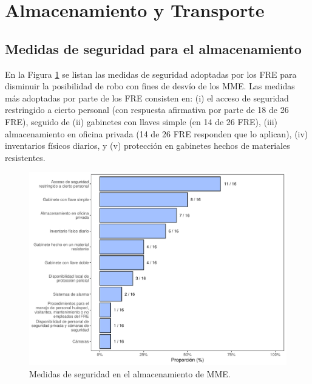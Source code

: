 \documentclass[
]{book}
\begin{document}
\hypertarget{almacenamiento-y-transporte}{%
\section{Almacenamiento y Transporte}\label{almacenamiento-y-transporte}}

\hypertarget{medidas-de-seguridad-para-el-almacenamiento}{%
\subsection{Medidas de seguridad para el almacenamiento}\label{medidas-de-seguridad-para-el-almacenamiento}}


En la Figura \ref{fig:MedidasSeguridadAlmacenamientoMME} se listan las medidas de seguridad adoptadas por los FRE para disminuir la posibilidad de robo con fines de desvío de los MME. Las medidas más adoptadas por parte de los FRE consisten en: (i) el acceso de seguridad restringido a cierto personal (con respuesta afirmativa por parte de 18 de 26 FRE), seguido de (ii) gabinetes con llaves simple (en 14 de 26 FRE), (iii) almacenamiento en oficina privada (14 de 26 FRE responden que lo aplican), (iv) inventarios físicos diarios, y (v) protección en gabinetes hechos de materiales resistentes.

\begin{figure}

{\centering \includegraphics[width=0.9\linewidth]{InformeFinal_files/figure-latex/MedidasSeguridadAlmacenamientoMME-1} 

}

\caption{Medidas de seguridad en el almacenamiento de MME.}\label{fig:MedidasSeguridadAlmacenamientoMME}
\end{figure}
\end{document}
